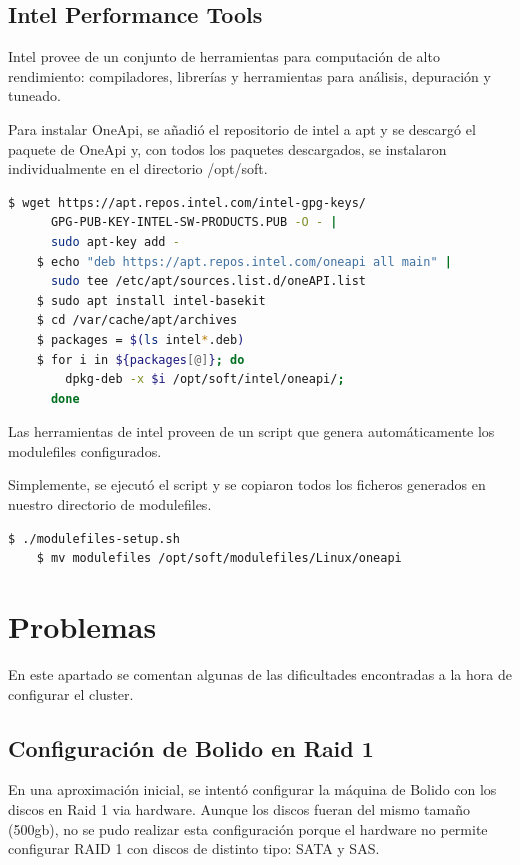 \subsection{Intel Performance Tools}

Intel provee de un conjunto de herramientas para computación de alto rendimiento: compiladores, librerías y herramientas para análisis, depuración y tuneado.
\vspace{2mm}

Para instalar OneApi, se añadió el repositorio de intel a apt y se descargó el paquete de OneApi \cite{inteloneapi} y, con todos los paquetes descargados, se instalaron individualmente en el directorio /opt/soft.
\vspace{2mm}

\begin{lstlisting}[language=bash]
    $ wget https://apt.repos.intel.com/intel-gpg-keys/
      GPG-PUB-KEY-INTEL-SW-PRODUCTS.PUB -O - |
      sudo apt-key add -
    $ echo "deb https://apt.repos.intel.com/oneapi all main" | 
      sudo tee /etc/apt/sources.list.d/oneAPI.list
    $ sudo apt install intel-basekit
    $ cd /var/cache/apt/archives
    $ packages = $(ls intel*.deb)
    $ for i in ${packages[@]}; do 
        dpkg-deb -x $i /opt/soft/intel/oneapi/; 
      done
\end{lstlisting}
\vspace{2mm}

Las herramientas de intel proveen de un script que genera automáticamente los modulefiles configurados.
\vspace{2mm}

Simplemente, se ejecutó el script y se copiaron todos los ficheros generados en nuestro directorio de modulefiles.
\vspace{2mm}

\begin{lstlisting}[language=bash]
    $ ./modulefiles-setup.sh
    $ mv modulefiles /opt/soft/modulefiles/Linux/oneapi
\end{lstlisting}


\section{Problemas}

En este apartado se comentan algunas de las dificultades encontradas a la hora de configurar el cluster.
\vspace{2mm}

\subsection{Configuración de Bolido en Raid 1}
En una aproximación inicial, se intentó configurar la máquina de Bolido con los discos en Raid 1 via hardware.
Aunque los discos fueran del mismo tamaño (500gb), no se pudo realizar esta configuración porque el hardware no permite configurar RAID 1 con discos de distinto tipo: SATA y SAS.
\vspace{2mm}

